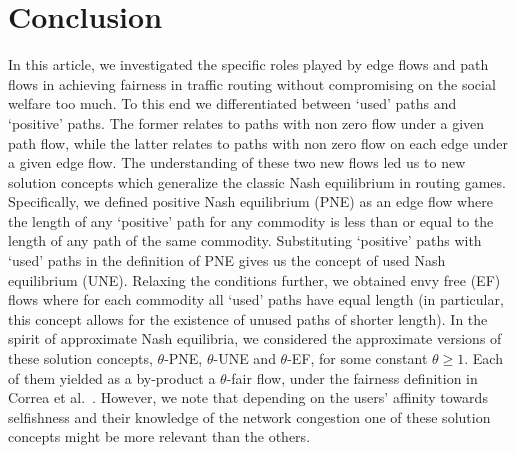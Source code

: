 \section{Conclusion}
In this article, we investigated the specific roles played by edge flows and path flows in achieving fairness in traffic routing without compromising on the social welfare too much. To this end we differentiated between `used' paths and `positive' paths. The former relates to paths with non zero flow under a given path flow, while the latter relates to paths with non zero flow on each edge under a given edge flow. The understanding of these two new flows led us to new solution concepts which generalize the classic Nash  equilibrium in routing games. Specifically, we defined positive Nash equilibrium (PNE) as an edge flow where the length of any `positive' path for any commodity is less than or equal to the length of any path of the same commodity.  Substituting `positive' paths with `used' paths in the definition of PNE gives us the concept of used Nash equilibrium (UNE). Relaxing the conditions further, we obtained envy free (EF) flows where for each commodity all `used' paths have equal length (in particular, this concept allows for the existence of unused paths of shorter length). In the spirit of approximate Nash equilibria, we considered the approximate versions of these solution concepts, $\theta$-PNE, $\theta$-UNE and $\theta$-EF, for some constant $\theta\geq 1$. Each of them yielded as a by-product a $\theta$-fair flow, under the fairness definition in Correa et al.~\cite{correa2007fast}.  However, we note that depending on the users' affinity towards selfishness and their knowledge of the network congestion one of these solution concepts might be more relevant than the others.  
  
